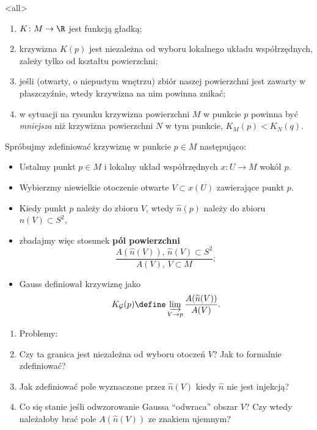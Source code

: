 \mode<all>{}
\begin{frame}[<+->]
\begin{enumerate}
\item $K\colon M\to \R$ jest funkcją gładką;
\item krzywizna $K(p)$ jest niezależna od wyboru lokalnego układu współrzędnych, zależy tylko od kształtu powierzchni;
\item jeśli (otwarty, o niepustym wnętrzu) zbiór naszej powierzchni jest zawarty w płaszczyźnie, wtedy krzywizna na nim powinna znikać;
\item w sytuacji na rysunku krzywizna powierzchni $M$ w punkcie $p$ powinna być \textit{mniejsza} niż krzywizna powierzchni $N$ w tym punkcie, $K_{M}(p)<K_{N}(q)$.
\end{enumerate}

\end{frame}
\begin{frame}[<+->]
\begin{center}

\end{center}
\end{frame}
\begin{frame}[<+->]
Spróbujmy zdefiniować krzywiznę w punkcie $p\in M$ następująco:
\begin{itemize}
\item Ustalmy punkt $p\in M$ i lokalny układ współrzędnych $x\colon U\to M$ wokół $p$.
\item Wybierzmy niewielkie otoczenie otwarte $V\subset x(U)$ zawierające punkt $p$.
\item Kiedy punkt $p$ należy do zbioru $V$, wtedy $\widehat{n}(p)$ należy do zbioru $\widehat{n}(V)\subset S^2$,
\item zbadajmy więc stosunek \textbf{pól powierzchni}\[\frac{A(\widehat{n}(V)),\, \widehat{n}(V)\subset S^2 }{A(V),\, V\subset M};\]
\item Gauss definiował krzywiznę jako \[K_{\mathcal{G}}(p)\define\varinjlim_{V\to p}\frac{A(\widehat{n}(V))}{A(V)}.\]
\end{itemize}
\end{frame}
\begin{frame}[<+->]

\begin{enumerate}
\item [] Problemy:
\item Czy ta granica jest niezależna od wyboru otoczeń $V$? Jak to formalnie zdefiniować?
\item Jak zdefiniować pole wyznaczone przez $\widehat{n}(V)$ kiedy $\widehat{n}$ nie jest injekcją?
\item Co się stanie jeśli odwzorowanie Gaussa ``odwraca'' obszar $V$? Czy wtedy należałoby brać pole $A(\widehat{n}(V))$ ze znakiem ujemnym?
\end{enumerate}

\end{frame}

